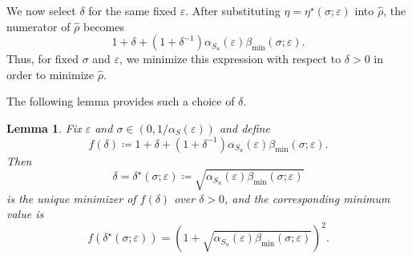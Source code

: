 \documentclass[letterpaper,10pt,conference]{ieeeconf}
\newtheorem{lemma}{Lemma}
\begin{document}

We now select $\delta$ for the same fixed $\varepsilon$.
After substituting $\eta = \eta^\star(\sigma; \varepsilon)$ into $\hat\rho$, the numerator of $\hat{\rho}$ becomes
\begin{equation}
  1+\delta+\left(1+\delta^{-1}\right)\alpha_{S_u}(\varepsilon)\beta_{\min}(\sigma; \varepsilon).
\end{equation}
Thus, for fixed $\sigma$ and $\varepsilon$, we minimize this expression with respect to $\delta > 0$ in order to minimize $\hat\rho$.

The following lemma provides such a choice of $\delta$.

\begin{lemma} \label{lem:choise_delta}
  Fix $\varepsilon$ and $\sigma \in (0,1/\alpha_S(\varepsilon))$ and define
  \begin{equation} \label{eq:def_f}
    f(\delta) \coloneqq 1+\delta+\left(1+\delta^{-1}\right)\alpha_{S_u}(\varepsilon)\beta_{\min}(\sigma; \varepsilon).
  \end{equation}
  Then
  \begin{equation} \label{eq:delta_star}
    \delta = \delta^\star(\sigma; \varepsilon) \coloneqq \sqrt{\alpha_{S_u}(\varepsilon)\beta_{\min}(\sigma; \varepsilon)}
  \end{equation}
  is the unique minimizer of $f(\delta)$ over $\delta > 0$, and the corresponding minimum value is
  \begin{equation} \label{eq:f_min}
    f(\delta^\star(\sigma; \varepsilon)) = \left(1+\sqrt{\alpha_{S_u}(\varepsilon)\beta_{\min}(\sigma; \varepsilon)}\right)^2.
  \end{equation}
\end{lemma}
\end{document}
